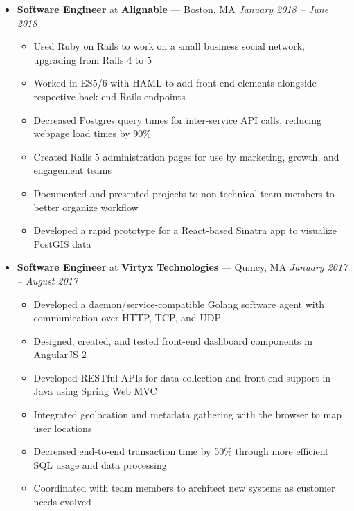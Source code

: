 \documentclass{article}
\begin{document}
\begin{itemize}[label={},leftmargin=*]
  \item \textbf{Software Engineer} at \textbf{Alignable} --- Boston, MA \hfill {\em January 2018 -- June 2018}
  \begin{itemize}[label={$\bullet$}]
    \item Used Ruby on Rails to work on a small business social network, upgrading from Rails 4 to 5
    \item Worked in ES5/6 with HAML to add front-end elements alongside respective back-end Rails endpoints
    \item Decreased Postgres query times for inter-service API calls, reducing webpage load times by 90\%
    \item Created Rails 5 administration pages for use by marketing, growth, and engagement teams
    \item Documented and presented projects to non-technical team members to better organize workflow
    \item Developed a rapid prototype for a React-based Sinatra app to visualize PostGIS data
  \end{itemize}

  \item \textbf{Software Engineer} at \textbf{Virtyx Technologies} --- Quincy, MA \hfill {\em January 2017 -- August 2017}
  \begin{itemize}[label={$\bullet$}]
    \item Developed a daemon/service-compatible Golang software agent with communication over HTTP, TCP, and UDP
    \item Designed, created, and tested front-end dashboard components in AngularJS 2
    \item Developed RESTful APIs for data collection and front-end support in Java using Spring Web MVC
    \item Integrated geolocation and metadata gathering with the browser to map user locations
    \item Decreased end-to-end transaction time by 50\% through more efficient SQL usage and data processing
    \item Coordinated with team members to architect new systems as customer needs evolved
  \end{itemize}
\end{itemize}
\end{document}
